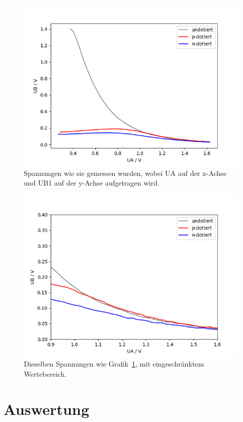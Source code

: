 \documentclass{article}
\begin{document}
\begin{figure}[H]
\includegraphics[scale=1.]{data_raw.png}
\caption{Spannungen wie sie gemessen wurden, wobei UA auf der x-Achse und UB1 auf der y-Achse aufgetragen wird.}
\label{fig:data_raw}
\end{figure}


\begin{figure}[H]
\includegraphics[scale=1.]{data_scaled.png}
\caption{Dieselben Spannungen wie Grafik~\ref{fig:data_raw}, mit eingeschränktem Wertebereich.}
\label{fig:data_scaled}
\end{figure}



\section{Auswertung}
\end{document}

